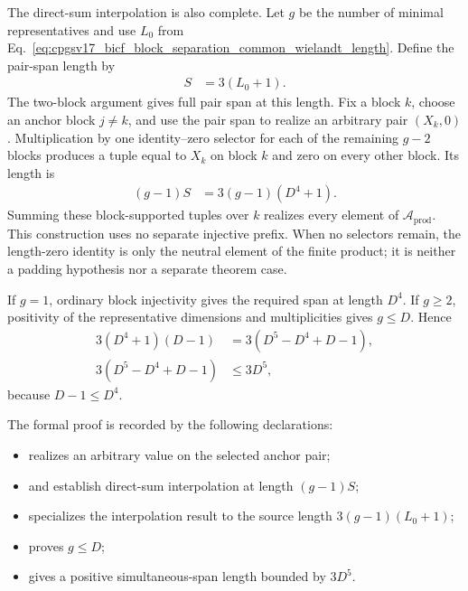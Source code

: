 \documentclass{article}
\begin{document}
The direct-sum interpolation is also complete. Let $g$ be the number of
minimal representatives and use $L_0$ from
Eq.~\ref{eq:cpgsv17_bicf_block_separation_common_wielandt_length}. Define the
pair-span length by
\begin{align}
    S
        &= 3(L_0+1).
    \label{eq:cpgsv17_bicf_block_separation_pair_span_length}
\end{align}
The two-block argument gives full pair span at this length. Fix a block $k$,
choose an anchor block $j\ne k$, and use the pair span to realize an arbitrary
pair $(X_k,0)$. Multiplication by one identity--zero selector for each of the
remaining $g-2$ blocks produces a tuple equal to $X_k$ on block $k$ and zero
on every other block. Its length is
\begin{align}
    (g-1)S
        &=3(g-1)(D^4+1).
    \label{eq:cpgsv17_bicf_block_separation_simultaneous_interpolation_length}
\end{align}
Summing these block-supported tuples over $k$ realizes every element of
$\mathcal A_{\mathrm{prod}}$. This construction uses no separate injective
prefix. When no selectors remain, the length-zero identity is only the neutral
element of the finite product; it is neither a padding hypothesis nor a
separate theorem case.

If $g=1$, ordinary block injectivity gives the required span at length $D^4$.
If $g\geq2$, positivity of the representative dimensions and multiplicities
gives $g\leq D$. Hence
\begin{align}
    3(D^4+1)(D-1)
        &=3(D^5-D^4+D-1),
    \label{eq:cpgsv17_bicf_block_separation_bound_expansion}\\
    3(D^5-D^4+D-1)
        &\leq 3D^5,
    \label{eq:cpgsv17_bicf_block_separation_three_d_pow_five_bound}
\end{align}
because $D-1\leq D^4$.

The formal proof is recorded by the following declarations:
\begin{itemize}
    \item
    realizes an arbitrary value on the selected anchor pair;
    \item
    and
    establish direct-sum interpolation at length $(g-1)S$;
    \item
    specializes the interpolation result to the source length
    $3(g-1)(L_0+1)$;
    \item
    proves $g\leq D$;
    \item
    gives a positive simultaneous-span length bounded by $3D^5$.
\end{itemize}
\end{document}
